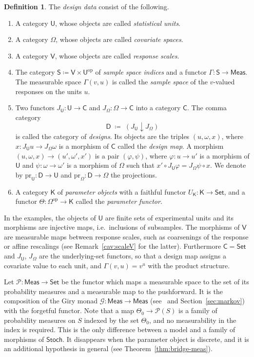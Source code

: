 \documentclass[11pt,a4paper]{article}
\theoremstyle{plain}
\theoremstyle{definition}
\newtheorem{definition}[theorem]{Definition}
\theoremstyle{remark}
\newcommand{\cat}[1]{\mathsf{#1}}
\newcommand{\catU}{\cat{U}}
\newcommand{\catV}{\cat{V}}
\newcommand{\catO}{\cat{\Omega}}
\newcommand{\catS}{\cat{S}}
\newcommand{\catD}{\cat{D}}
\newcommand{\catK}{\cat{K}}
\newcommand{\Meas}{\cat{Meas}}
\newcommand{\Set}{\cat{Set}}
\newcommand{\Stoch}{\cat{Stoch}}
\newcommand{\G}{\mathcal{G}}
\newcommand{\Prb}{\mathcal{P}}
\newcommand{\op}{\mathrm{op}}
\newcommand{\pr}{\mathrm{pr}}
\begin{document}
\begin{definition}\label{def:designdata}
The \emph{design data} consist of the following.
\begin{enumerate}
\item A category $\catU$, whose objects are called \emph{statistical units}.
\item A category $\catO$, whose objects are called \emph{covariate spaces}.
\item A category $\catV$, whose objects are called \emph{response scales}.
\item The category $\catS \coloneqq \catV \times \catU^{\op}$ of \emph{sample
space indices} and a functor $\Gamma \colon \catS \to \Meas$. The measurable
space $\Gamma(v,u)$ is called the \emph{sample space} of the $v$-valued
responses on the units $u$.
\item Two functors $J_{\catU} \colon \catU \to \cat{C}$ and
$J_{\catO} \colon \catO \to \cat{C}$ into a category $\cat{C}$. The comma
category
\[
\catD \;\coloneqq\; (J_{\catU} \downarrow J_{\catO})
\]
is called the category of \emph{designs}. Its objects are the triples
$(u,\omega,x)$, where $x \colon J_\catU u \to J_\catO \omega$ is a morphism of
$\cat{C}$ called the \emph{design map}. A morphism
$(u,\omega,x) \to (u',\omega',x')$ is a pair $(\varphi,\psi)$, where
$\varphi \colon u \to u'$ is a morphism of $\catU$ and
$\psi \colon \omega \to \omega'$ is a morphism of $\catO$ such that
$x' \circ J_{\catU}\varphi = J_{\catO}\psi \circ x$. We denote by
$\pr_{\catU} \colon \catD \to \catU$ and $\pr_{\catO} \colon \catD \to \catO$
the projections.
\item A category $\catK$ of \emph{parameter objects} with a faithful functor
$U_{\catK} \colon \catK \to \Set$, and a functor
$\Theta \colon \catO^{\op} \to \catK$ called the \emph{parameter functor}.
\end{enumerate}
\end{definition}

In the examples, the objects of $\catU$ are finite sets of experimental units
and its morphisms are injective maps, i.e.\ inclusions of subsamples. The
morphisms of $\catV$ are measurable maps between response scales, such as
coarsenings of the response or affine rescalings (see
Remark~\ref{cav:scaleV} for the latter). Furthermore $\cat{C} = \Set$ and
$J_{\catU}$, $J_{\catO}$ are the underlying-set functors, so that a design map
assigns a covariate value to each unit, and $\Gamma(v,u) = v^{u}$ with the
product structure.

Let $\Prb \colon \Meas \to \Set$ be the functor which maps a measurable space
to the set of its probability measures and a measurable map to the
pushforward. It is the composition of the Giry monad
$\G \colon \Meas \to \Meas$ (see~\cite{giry_categorical_1982} and
Section~\ref{sec:markov}) with the forgetful functor. Note that a map
$\Theta_0 \to \Prb(S)$ is a family of probability measures on $S$ indexed by
the set $\Theta_0$, and no measurability in the index is required. This is the
only difference between a model and a family of morphisms of $\Stoch$. It
disappears when the parameter object is discrete, and it is an additional
hypothesis in general (see Theorem~\ref{thm:bridge-meas}).
\end{document}
